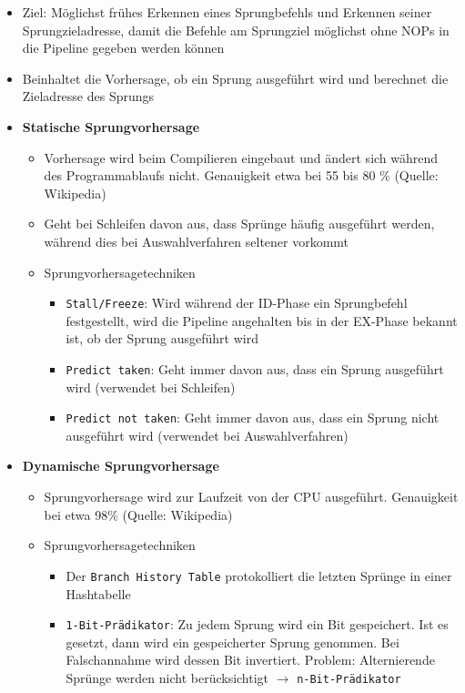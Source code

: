 \begin{itemize}
	\item Ziel: Möglichst frühes Erkennen eines Sprungbefehls und Erkennen seiner Sprungzieladresse, damit die Befehle am Sprungziel möglichst ohne NOPs in die Pipeline gegeben werden können
	\item Beinhaltet die Vorhersage, ob ein Sprung ausgeführt wird und berechnet die Zieladresse des Sprungs
	\item \textbf{Statische Sprungvorhersage}
	\begin{itemize}
		\item Vorhersage wird beim Compilieren eingebaut und ändert sich während des Programmablaufs nicht. Genauigkeit etwa bei 55 bis 80 \% (Quelle: Wikipedia)
		\item Geht bei Schleifen davon aus, dass Sprünge häufig ausgeführt werden, während dies bei Auswahlverfahren seltener vorkommt
		\item Sprungvorhersagetechniken
		\begin{itemize}
			\item \texttt{Stall/Freeze}: Wird während der ID-Phase ein Sprungbefehl festgestellt, wird die Pipeline angehalten bis in der EX-Phase bekannt ist, ob der Sprung ausgeführt wird
			\item \texttt{Predict taken}: Geht immer davon aus, dass ein Sprung ausgeführt wird (verwendet bei Schleifen)
			\item \texttt{Predict not taken}: Geht immer davon aus, dass ein Sprung nicht ausgeführt wird (verwendet bei Auswahlverfahren)
		\end{itemize}
	\end{itemize}
	\item \textbf{Dynamische Sprungvorhersage}
	\begin{itemize}
		\item Sprungvorhersage wird zur Laufzeit von der CPU ausgeführt. Genauigkeit bei etwa 98\% (Quelle: Wikipedia)
		\item Sprungvorhersagetechniken
		\begin{itemize}
			\item Der \texttt{Branch History Table} protokolliert die letzten Sprünge in einer Hashtabelle
			\item \texttt{1-Bit-Prädikator}: Zu jedem Sprung wird ein Bit gespeichert. Ist es gesetzt, dann wird ein gespeicherter Sprung genommen. Bei Falschannahme wird dessen Bit invertiert. Problem: Alternierende Sprünge werden nicht berücksichtigt \(\rightarrow\) \texttt{n-Bit-Prädikator}

\end{itemize}
\end{itemize}
\end{itemize}
